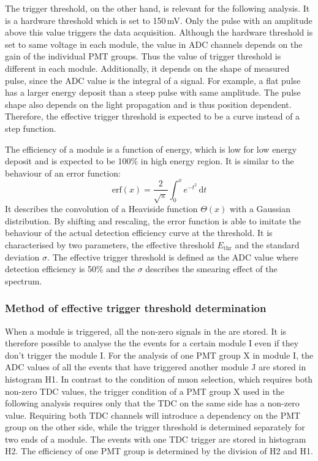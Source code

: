 The trigger threshold, on the other hand, is relevant for the following analysis. It is a hardware threshold which is set to 150\,mV. Only the pulse with an amplitude above this value triggers the data acquisition. Although the hardware threshold is set to same voltage in each module, the value in ADC channels depends on the gain of the individual PMT groups. Thus the value of trigger threshold is different in each module. Additionally, it depends on the shape of measured pulse, since the ADC value is the integral of a signal. For example, a flat pulse has a larger energy deposit than a steep pulse with same amplitude. The pulse shape also depends on the light propagation and is thus position dependent. Therefore, the effective trigger threshold is expected to be a curve instead of a step function.

The efficiency of a module is a function of energy, which is low for low energy deposit and is expected to be 100\% in high energy region. It is similar to the behaviour of an error function:
\begin{equation}
  \mathrm{erf}(x)=\frac{2}{\sqrt{\pi}} \int_{0}^{x} \! e^{-t^{2}}\, \mathrm{d}t
\end{equation}
It describes the convolution of a Heaviside function $\Theta(x)$ with a Gaussian distribution. By shifting and rescaling, the error function is able to imitate the behaviour of the actual detection efficiency curve at the threshold. It is characterised by two parameters, the effective threshold $E_{\mathrm{thr}}$ and the standard deviation $\sigma$. The effective trigger threshold is defined as the ADC value where detection efficiency is 50\% and the $\sigma$ describes the smearing effect of the spectrum.

\subsubsection*{Method of effective trigger threshold determination}

When a module is triggered, all the non-zero signals in the \mvs{} are stored. It is therefore possible to analyse the the events for a certain module I even if they don't trigger the module I. For the analysis of one PMT group X in module I, the ADC values of all the events that have triggered another module J are stored in histogram H1. In contrast to the condition of muon selection, which requires both non-zero TDC values, the trigger condition of a PMT group X used in the following analysis requires only that the TDC on the same side has a non-zero value. Requiring both TDC channels will introduce a dependency on the PMT group on the other side, while the trigger threshold is determined separately for two ends of a module. The events with one TDC trigger are stored in histogram H2. The efficiency of one PMT group is determined by the division of H2 and H1.

